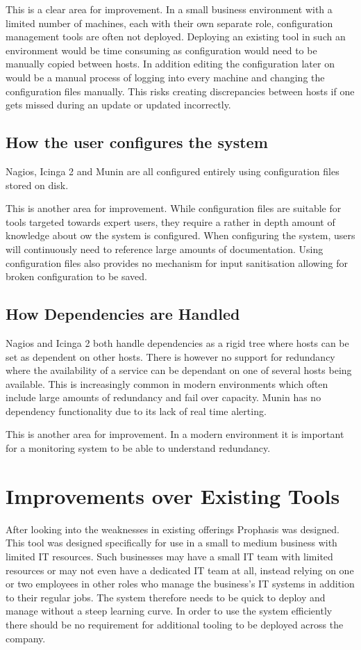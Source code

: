 \documentclass[bsc,deptreport,twoside,parskip,singlespacing,notimes]{infthesis}
\begin{document}
	This is a clear area for improvement. In a small business environment with a
	limited number of machines, each with their own separate role, configuration
	management tools are often not deployed.  Deploying an existing tool
	in such an environment would be time consuming as configuration would need
	to be manually copied between hosts. In addition editing the configuration later on
	would be a manual process of logging into every machine and changing the
	configuration files manually. This risks creating discrepancies between
	hosts if one gets missed during an update or updated incorrectly.

\subsection{How the user configures the system}

	Nagios, Icinga 2 and Munin are all configured entirely using configuration
	files stored on disk.


	This is another area for improvement. While configuration files are suitable
	for tools targeted towards expert users, they require a rather in depth amount
	of knowledge about ow the system is configured.  When configuring the system,
	users will continuously need to reference large amounts of documentation. Using
	configuration files also provides no mechanism for input sanitisation allowing
	for broken configuration to be saved.

\subsection{How Dependencies are Handled}

	Nagios and Icinga 2 both handle dependencies as a rigid tree where hosts can
	be set as dependent on other hosts.  There is however no support for redundancy
	where the availability of a service can be dependant on one of several hosts
	being available. This is increasingly common in modern environments which often
	include large amounts of redundancy and fail over capacity. Munin has no
	dependency functionality due to its lack of real time alerting.

	This is another area for improvement. In a modern environment it is
	important for a monitoring system to be able to understand redundancy.

\section{Improvements over Existing Tools}
	After looking into the weaknesses in existing offerings	Prophasis was designed.
	This tool was designed specifically for use in a small to medium business with limited IT
	resources.  Such businesses may have a small IT team with limited resources or may not
	even have a dedicated IT team at all, instead relying on one or two employees
	in other roles who manage the business's IT systems in addition to their
	regular jobs. The system therefore needs to be quick to deploy and manage without
	a steep learning curve. In order to use the system efficiently there should
	be no requirement for additional tooling to be deployed across the company.
\end{document}
